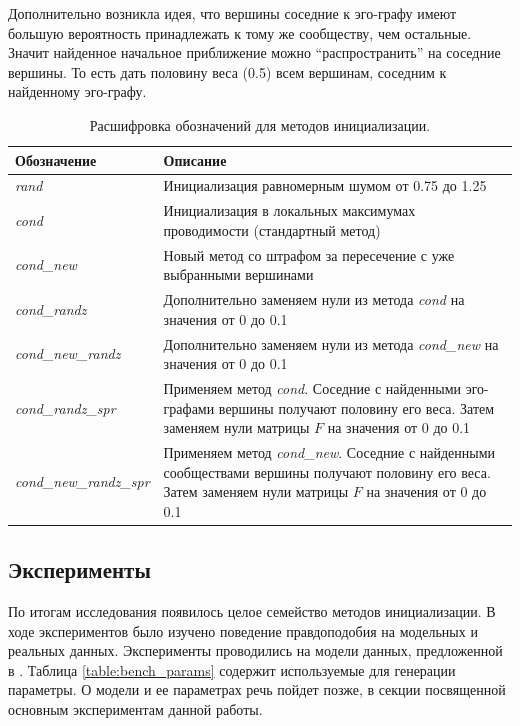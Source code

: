 \documentclass{ITaSconf}
\begin{document}
	Дополнительно возникла идея, что вершины соседние к эго-графу имеют большую вероятность принадлежать к тому же сообществу, чем остальные. 
	Значит найденное начальное приближение можно ``распространить'' на соседние вершины. 
	То есть дать половину веса (0.5) всем вершинам, соседним к найденному эго-графу.
	\begin{center}
		\begin{table}
			\centering
			\begin{tabular}{ p{9.5em} p{38em} }
				\hline
				\hline
				\textbf{Обозначение} 		& \textbf{Описание} \\
				\hline
				\textit{rand} 				& Инициализация равномерным шумом от 0.75 до 1.25 \\
				\textit{cond} 				& Инициализация в локальных максимумах проводимости (стандартный метод) \\
				\textit{cond\_new} 			& Новый метод со штрафом за пересечение с уже выбранными вершинами \\
				\textit{cond\_randz} 		& Дополнительно заменяем нули из метода \textit{cond} на значения от 0 до 0.1 \\
				\textit{cond\_new\_randz} 	& Дополнительно заменяем нули из метода \textit{cond\_new} на значения от 0 до 0.1 \\
				\textit{cond\_randz\_spr} 	& Применяем метод \textit{cond}. Соседние с найденными эго-графами вершины получают половину его веса. Затем заменяем нули матрицы $F$ на значения от 0 до 0.1 \\
				\textit{cond\_new\_randz\_spr} & Применяем метод \textit{cond\_new}. Соседние с найденными сообществами вершины получают половину его веса. Затем заменяем нули матрицы $F$ на значения от 0 до 0.1 \\
				\hline
				\hline
			\end{tabular}
			\caption{Расшифровка обозначений для методов инициализации.}
			\label{table:init_methods}
		\end{table}
	\end{center}
	\subsection{Эксперименты} 
	
	По итогам исследования появилось целое семейство методов инициализации. 
	В ходе экспериментов было изучено поведение правдоподобия на модельных и реальных данных. 
	Эксперименты проводились на модели данных, предложенной в \cite{lancichinetti2009benchmarks}. 
	Таблица \ref{table:bench_params} содержит используемые для генерации параметры. 
	О модели и ее параметрах речь пойдет позже, в секции посвященной основным экспериментам данной работы.
	
\end{document}
